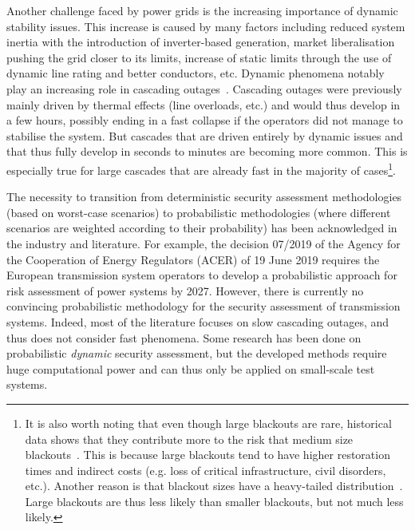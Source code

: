 Another challenge faced by power grids is the increasing importance of dynamic stability issues. This increase is caused by many factors including reduced system inertia with the introduction of inverter-based generation, market liberalisation pushing the grid closer to its limits, increase of static limits through the use of dynamic line rating and better conductors, etc. Dynamic phenomena notably play an increasing role in cascading outages~\cite{cascadeAcceleration}. Cascading outages were previously mainly driven by thermal effects (line overloads, etc.) and would thus develop in a few hours, possibly ending in a fast collapse if the operators did not manage to stabilise the system. But cascades that are driven entirely by dynamic issues and that thus fully develop in seconds to minutes are becoming more common. This is especially true for large cascades that are already fast in the majority of cases\footnote{It is also worth noting that even though large blackouts are rare, historical data shows that they contribute more to the risk that medium size blackouts~\cite{CascadingMethodoAndChallenges, LargeContributeMoreThanMediumBlackouts}. This is because large blackouts tend to have higher restoration times and indirect costs (e.g. loss of critical infrastructure, civil disorders, etc.). Another reason is that blackout sizes have a heavy-tailed distribution~\cite{CascadingMethodoAndChallenges, LargeContributeMoreThanMediumBlackouts}. Large blackouts are thus less likely than smaller blackouts, but not much less likely.
}. 

The necessity to transition from deterministic security assessment methodologies (based on worst-case scenarios) to probabilistic methodologies (where different scenarios are weighted according to their probability) has been acknowledged in the industry and literature. For example, the decision 07/2019 of the Agency for the Cooperation of Energy Regulators (ACER) of 19 June 2019 requires the European transmission system operators to develop a probabilistic approach for risk assessment of power systems by 2027. However, there is currently no convincing probabilistic methodology for the security assessment of transmission systems. Indeed, most of the literature focuses on slow cascading outages, and thus does not consider fast phenomena. Some research has been done on probabilistic \textit{dynamic} security assessment, but the developed methods require huge computational power and can thus only be applied on small-scale test systems.


